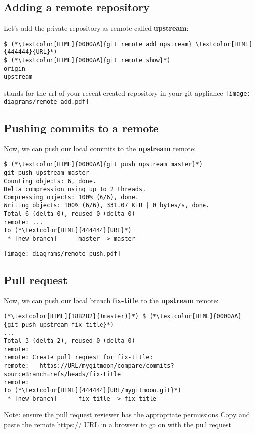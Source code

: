 \subsection{Adding a remote repository}
\begin{frame}[fragile]
  \subslidetitle
  Let's add the private repository as remote called \textbf{upstream}:
  \begin{lstlisting}
$ (*\textcolor[HTML]{0000AA}{git remote add upstream} \textcolor[HTML]{444444}{URL}*)
$ (*\textcolor[HTML]{0000AA}{git remote show}*)
origin
upstream
\end{lstlisting}
\vspace{1em}
 stands for the url of your recent created repository in your git appliance
\vspace{1em}
\center \texttt{[image: diagrams/remote-add.pdf]}
\end{frame}

\subsection{Pushing commits to a remote}
\begin{frame}[fragile]
  \subslidetitle
  Now, we can push our local commits to the \textbf{upstream} remote:
  \begin{lstlisting}
$ (*\textcolor[HTML]{0000AA}{git push upstream master}*)
git push upstream master
Counting objects: 6, done.
Delta compression using up to 2 threads.
Compressing objects: 100% (6/6), done.
Writing objects: 100% (6/6), 331.07 KiB | 0 bytes/s, done.
Total 6 (delta 0), reused 0 (delta 0)
remote: ...
To (*\textcolor[HTML]{444444}{URL}*)
 * [new branch]      master -> master
\end{lstlisting}
\vspace{-1.1em}
\center \texttt{[image: diagrams/remote-push.pdf]}
\end{frame}

\subsection{Pull request}
\begin{frame}[fragile]
  \subslidetitle
  Now, we can push our local branch \textbf{fix-title} to the \textbf{upstream} remote:
  \begin{lstlisting}
(*\textcolor[HTML]{18B2B2}{(master)}*) $ (*\textcolor[HTML]{0000AA}{git push upstream fix-title}*)
...
Total 3 (delta 2), reused 0 (delta 0)
remote:
remote: Create pull request for fix-title:
remote:   https://URL/mygitmoon/compare/commits?sourceBranch=refs/heads/fix-title
remote:
To (*\textcolor[HTML]{444444}{URL/mygitmoon.git}*)
 * [new branch]      fix-title -> fix-title
\end{lstlisting}
  Note: ensure the pull request reviewer has the appropriate permissions
  \newline
  Copy and paste the remote https:// URL in a browser to go on with the pull request
\end{frame}

